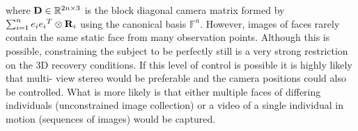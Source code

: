 where $\boldsymbol{\mathbf{D}} \in \mathbb{R}^{2n \times 3}$ is the block diagonal camera matrix
formed by $\sum_{i=1}^n e_i {e_i}^T \otimes \boldsymbol{\mathbf{R}}_i$ using the canonical
basis $\mathbb{F}^n$. However, images of faces rarely contain the same static
face from many observation points. Although this is possible, constraining the
subject to be perfectly still is a very strong restriction on the 3D recovery
conditions. If this level of control is possible it is highly likely that multi-
view stereo would be preferable and the camera positions could also be
controlled. What is more likely is that either multiple faces of differing
individuals (unconstrained image collection) or a video of a single individual
in motion (sequences of images) would be captured.
